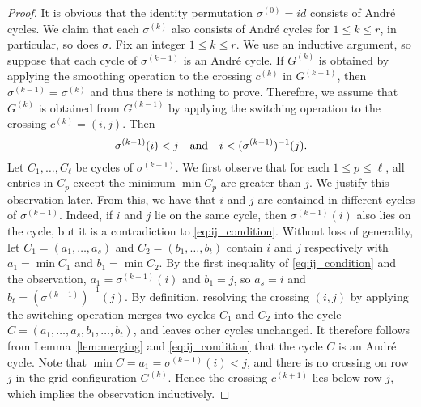 \begin{proof}
  It is obvious that the identity permutation \( \sigma^{(0)}=id \) consists of
  Andr\'e cycles. We claim that each \( \sigma^{(k)} \) also consists of Andr\'e cycles 
  for \( 1\le k\le r \), in particular, so does \( \sigma \).
  Fix an integer \( 1\le k\le r \).
  We use an inductive argument, so suppose that each cycle of \( \sigma^{(k-1)} \)
  is an Andr\'e cycle.
  If \( G^{(k)} \) is obtained by applying the smoothing operation to
  the crossing \( c^{(k)} \) in \( G^{(k-1)} \),
  then \( \sigma^{(k-1)}=\sigma^{(k)} \) and thus there is nothing to prove.
  Therefore, we assume that \( G^{(k)} \) is obtained from \( G^{(k-1)} \)
  by applying the switching operation to the crossing \( c^{(k)}=(i,j) \).
  Then 
  \begin{equation} \label{eq:ij_condition}
    \sigma^{(k-1)}(i)<j \quad\mbox{and}\quad i<(\sigma^{(k-1)})^{-1}(j).
  \end{equation}
  Let \( C_1, \dots, C_\ell \) be cycles of \( \sigma^{(k-1)} \).
  We first observe that for each \( 1\le p\le \ell \), all entries in \( C_p \)
  except the minimum \( \min C_p \) are greater than \( j \).
  We justify this observation later.
  From this, we have that \( i \) and \( j \) are contained in different cycles
  of \( \sigma^{(k-1)} \). Indeed, if \( i \) and \( j \) lie on the same cycle,
  then \( \sigma^{(k-1)}(i) \) also lies on the cycle, but it is a contradiction to
  \eqref{eq:ij_condition}.
  Without loss of generality, let \( C_1=(a_1,\dots,a_s) \) and
  \( C_2=(b_1,\dots,b_t) \) contain \( i \) and \( j \) respectively
  with \( a_1=\min C_1 \) and \( b_1 = \min C_2 \).
  By the first inequality of \eqref{eq:ij_condition} and the observation,
  \( a_1 = \sigma^{(k-1)}(i) \) and \( b_1 = j \), so \( a_s = i \) and
  \( b_t = (\sigma^{(k-1)})^{-1}(j) \).
  By definition, resolving the crossing \( (i,j) \) by applying the switching operation merges two cycles \( C_1 \) and
  \( C_2 \) into the cycle \( C=(a_1,\dots,a_s,b_1,\dots,b_t) \),
  and leaves other cycles unchanged.
  It therefore follows from Lemma~\ref{lem:merging} and \eqref{eq:ij_condition}
  that the cycle \( C \) is an Andr\'e cycle.
  Note that \( \min C = a_1 = \sigma^{(k-1)}(i) < j \), and there is no crossing on
  row \( j \) in the grid configuration \( G^{(k)} \).
  Hence the crossing \( c^{(k+1)} \) lies below row \( j \),
  which implies the observation inductively.


\end{proof}
